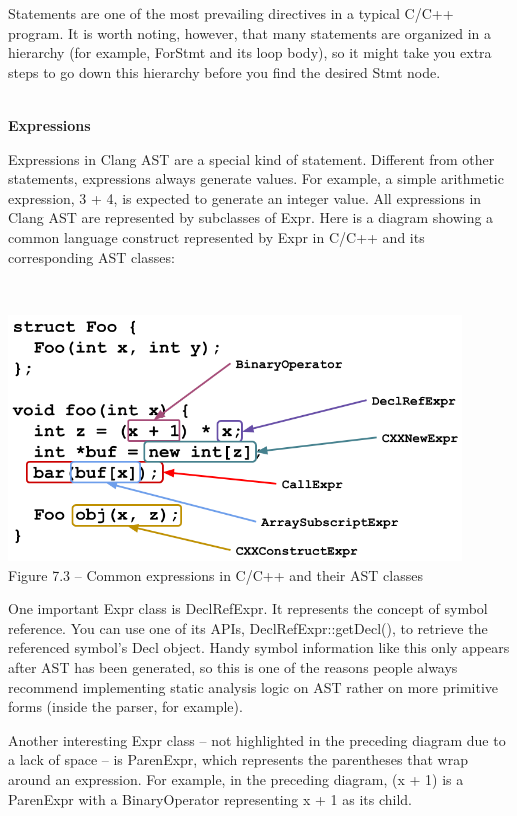 Statements are one of the most prevailing directives in a typical C/C++ program. It is worth noting, however, that many statements are organized in a hierarchy (for example, ForStmt and its loop body), so it might take you extra steps to go down this hierarchy before you find the desired Stmt node.

\hspace*{\fill} \\ %
\noindent
\textbf{Expressions}

Expressions in Clang AST are a special kind of statement. Different from other statements, expressions always generate values. For example, a simple arithmetic expression, 3 + 4, is expected to generate an integer value. All expressions in Clang AST are represented by subclasses of Expr. Here is a diagram showing a common language construct represented by Expr in C/C++ and its corresponding AST classes:

\hspace*{\fill} \\ %
\begin{center}
\includegraphics[width=0.9\textwidth]{content/2/chapter7/images/3.png}\\
Figure 7.3 – Common expressions in C/C++ and their AST classes
\end{center}

One important Expr class is DeclRefExpr. It represents the concept of symbol reference. You can use one of its APIs, DeclRefExpr::getDecl(), to retrieve the referenced symbol's Decl object. Handy symbol information like this only appears after AST has been generated, so this is one of the reasons people always recommend implementing static analysis logic on AST rather on more primitive forms (inside the parser, for example).

Another interesting Expr class – not highlighted in the preceding diagram due to a lack of space – is ParenExpr, which represents the parentheses that wrap around an expression. For example, in the preceding diagram, (x + 1) is a ParenExpr with a BinaryOperator representing x + 1 as its child.


